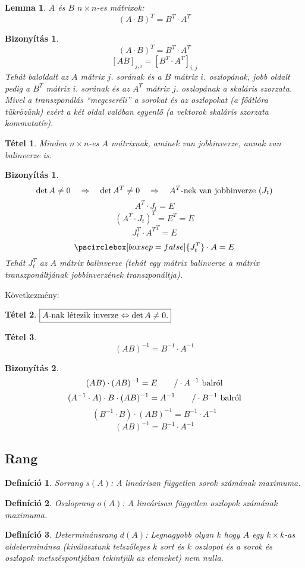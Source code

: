 \documentclass[a4paper,12pt,twoside]{book}
\newtheorem{defi}{Definíció}[chapter]
\newtheorem{tetel}{Tétel}[chapter]
\newtheorem{lemma}{Lemma}[chapter]
\newtheorem{biz}{Bizonyítás}[chapter]
\newtheorem{bizlemma}{Bizonyítás}[chapter]
\theoremstyle{break}
\begin{document}
\begin{lemma}
 $A$ és $B$ $n\times n$-es mátrixok:
\[(A\cdot B)^T = B^T\cdot A^T\]
\end{lemma}
\begin{bizlemma}
\[(A\cdot B)^T = B^T\cdot A^T\]
\[\left[AB\right]_{j,i} = \left[B^T\cdot A^T\right]_{i,j}\] 
Tehát baloldalt az $A$ mátrix $j$. sorának és a $B$ mátrix $i$. oszlopának, jobb oldalt pedig a $B^T$ mátrix $i.$ sorának és az $A^T$ mátrix $j$. oszlopának a skaláris szorzata. Mivel a transzponálás ``megcseréli'' a sorokat és az oszlopokat (a főátlóra tükrözünk) ezért a két oldal valóban egyenlő (a vektorok skaláris szorzata kommutatív).
\end{bizlemma}

\begin{tetel}
 Minden $n\times n$-es $A$ mátrixnak, aminek van jobbinverze, annak van balinverze is.
\end{tetel}
\begin{biz}
 \[\det A \neq 0 \quad \Rightarrow \quad \det A^T \neq 0 \quad \Rightarrow \quad A^T\hbox{-nek van jobbinverze ($J_t$)}\]
 \[A^T\cdot J_{t} = E\]
 \[(A^T\cdot J_{t})^T = E^T = E\]
 \[J_{t}^T\cdot {A^T}^T = E\]
 \[\pscirclebox[boxsep=false]{J_{t}^T}\cdot A = E\]
 Tehát $J_{t}^T$ az $A$ mátrix balinverze (tehát egy mátrix balinverze a mátrix transzponáltjának jobbinverzének transzponáltja).
\end{biz}

Következmény:
\begin{tetel}
 $\boxed{A$-nak létezik inverze $\Leftrightarrow \det A\neq 0$.$}$
\end{tetel}
\addtocounter{biz}{1} %

\begin{tetel}
 \[\boxed{ (AB)^{-1} = B^{-1}\cdot A^{-1} }\]
\end{tetel}
\begin{biz}
 \[(AB)\cdot (AB)^{-1} = E \qquad /\cdot A^{-1} \hbox{ balról}\]
 \[(A^{-1}\cdot A)\cdot B\cdot (AB)^{-1} = A^{-1} \qquad /\cdot B^{-1} \hbox{ balról}\]
 \[(B^{-1}\cdot B)\cdot (AB)^{-1} = B^{-1}\cdot A^{-1}\]
 \[(AB)^{-1} = B^{-1}\cdot A^{-1}\]
\end{biz}

\subsection{Rang}

\begin{defi} \emph{Sorrang} $s(A)$: A lineárisan független sorok számának maximuma. \end{defi}
\begin{defi} \emph{Oszloprang} $o(A)$: A lineárisan független oszlopok számának maximuma. \end{defi}
\begin{defi} \emph{Determinánsrang} $d(A)$: Legnagyobb olyan $k$ hogy $A$ egy $k\times k$-as aldeterminánsa (kiválasztunk tetszőleges $k$ sort és $k$ oszlopot és a sorok és oszlopok metszéspontjában tekintjük az elemeket) nem nulla. \end{defi}
\end{document}

